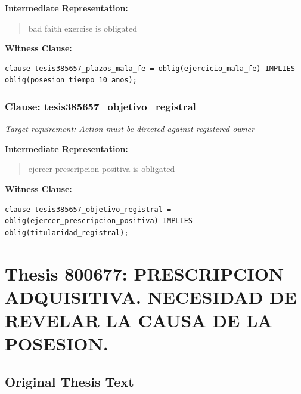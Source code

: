 \documentclass[11pt,a4paper]{article}
\begin{document}
\textbf{Intermediate Representation:}

\begin{quote}
bad faith exercise is obligated
\end{quote}

\textbf{Witness Clause:}

\begin{lstlisting}[style=witnessstyle, language=Witness]
clause tesis385657_plazos_mala_fe = oblig(ejercicio_mala_fe) IMPLIES oblig(posesion_tiempo_10_anos);
\end{lstlisting}

\subsubsection{Clause: tesis385657\_objetivo\_registral}

\textit{Target requirement: Action must be directed against registered owner}

\textbf{Intermediate Representation:}

\begin{quote}
ejercer prescripcion positiva is obligated
\end{quote}

\textbf{Witness Clause:}

\begin{lstlisting}[style=witnessstyle, language=Witness]
clause tesis385657_objetivo_registral = oblig(ejercer_prescripcion_positiva) IMPLIES oblig(titularidad_registral);
\end{lstlisting}

\newpage

\section{Thesis 800677: PRESCRIPCION ADQUISITIVA. NECESIDAD DE REVELAR LA CAUSA DE LA POSESION.}
\label{thesis:800677}

\subsection{Original Thesis Text}
\end{document}
